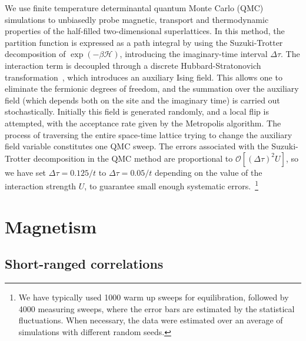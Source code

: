 \documentclass[aps,pra,reprint,twocolumn,showpacs,longbibliography,superscriptaddress]{revtex4-1}
\begin{document}
We use finite temperature determinantal quantum Monte Carlo (QMC) simulations to unbiasedly probe magnetic, transport and thermodynamic properties of the half-filled two-dimensional superlattices. In this method, the partition function is expressed as a path integral by using the Suzuki-Trotter decomposition of $\exp(-\beta\mathcal{H})$, introducing the imaginary-time interval $\Delta\tau$.
The interaction term is decoupled through a discrete Hubbard-Stratonovich transformation~\cite{Blankenbecler81,Hirsch83}, which introduces an auxiliary Ising field.
This allows one to eliminate the fermionic degrees of freedom, and the summation over the auxiliary field (which depends both on the site and the imaginary time) is carried out stochastically.
Initially this field is generated randomly, and a local flip is attempted, with the acceptance rate given by the Metropolis algorithm.
The process of traversing the entire space-time lattice trying to change the auxiliary field variable constitutes one QMC sweep.
The errors associated with the Suzuki-Trotter decomposition in the QMC method are proportional to $\mathcal{O}\left[(\Delta\tau)^2 U\right]$, so we have set $\Delta\tau=0.125/t$ to $\Delta\tau=0.05/t$
depending on the value of the interaction strength $U$, to guarantee small enough systematic errors.~\footnote{We have typically used 1000 warm up sweeps for equilibration, followed by 4000 measuring sweeps, where the error bars are estimated by the statistical fluctuations. When necessary, the data were estimated over an average of simulations with different random seeds.}


\section{Magnetism}
\label{sec:magnetism}
\subsection{Short-ranged correlations}
\end{document}
